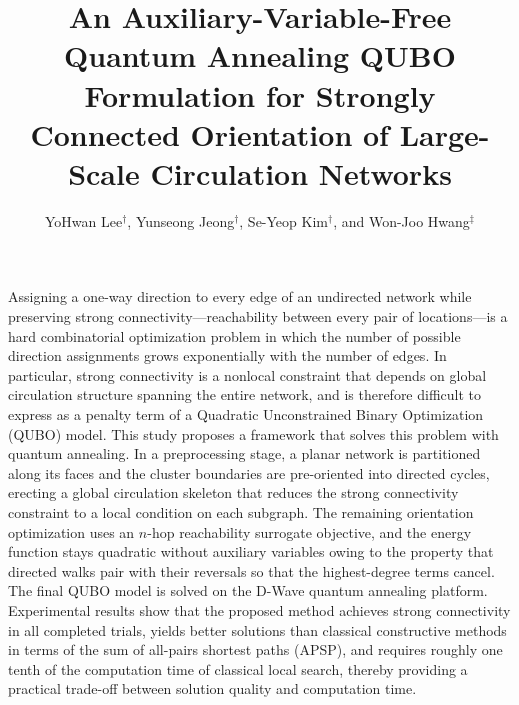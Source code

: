 \documentclass[twocolumn,a4paper]{article}
\begin{document}
\title{An Auxiliary-Variable-Free Quantum Annealing
QUBO Formulation for Strongly Connected Orientation
of Large-Scale Circulation Networks}
\author{YoHwan Lee${}^\dag$, Yunseong Jeong${}^\dag$, Se-Yeop Kim${}^\dag$, and Won-Joo Hwang${}^\ddag$}
\address{\dag School of Computer Science and Engineering, Pusan National University \\
\ddag Department of Information Convergence Engineering, Pusan National University \\
Busan 46241, Republic of Korea \\
Email: , , , }
\maketitle

\abstract
Assigning a one-way direction to every edge of an undirected network while preserving strong connectivity—reachability between every pair of locations—is a hard combinatorial optimization problem in which the number of possible direction assignments grows exponentially with the number of edges. In particular, strong connectivity is a nonlocal constraint that depends on global circulation structure spanning the entire network, and is therefore difficult to express as a penalty term of a Quadratic Unconstrained Binary Optimization (QUBO) model. This study proposes a framework that solves this problem with quantum annealing. In a preprocessing stage, a planar network is partitioned along its faces and the cluster boundaries are pre-oriented into directed cycles, erecting a global circulation skeleton that reduces the strong connectivity constraint to a local condition on each subgraph. The remaining orientation optimization uses an $n$-hop reachability surrogate objective, and the energy function stays quadratic without auxiliary variables owing to the property that directed walks pair with their reversals so that the highest-degree terms cancel. The final QUBO model is solved on the D-Wave quantum annealing platform. Experimental results show that the proposed method achieves strong connectivity in all completed trials, yields better solutions than classical constructive methods in terms of the sum of all-pairs shortest paths (APSP), and requires roughly one tenth of the computation time of classical local search, thereby providing a practical trade-off between solution quality and computation time.
\endabstract
\end{document}
